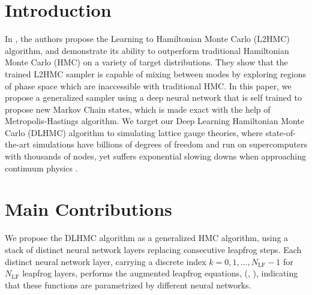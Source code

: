 \documentclass{article} %
\begin{document}
\section{\label{sec:introduction}Introduction}
In \citet{levy2017}, the authors propose the Learning to Hamiltonian Monte Carlo (L2HMC) algorithm, and demonstrate
its ability to outperform traditional Hamiltonian Monte Carlo (HMC) on a variety of %
target
distributions.
%
They show that the trained L2HMC sampler is capable of mixing between modes by exploring regions of phase space which are %
inaccessible with traditional HMC.
%
In this paper, we propose a generalized sampler using a deep neural network that is self trained to propose new Markov Chain states,
which is made exact with the help of Metropolis-Hastings \citep{zbMATH03349185} algorithm.
We target our Deep Learning Hamiltonian Monte Carlo (DLHMC) algorithm to simulating lattice gauge theories,
where state-of-the-art simulations have billions of degrees of freedom and run on supercomputers with thousands of nodes,
yet suffers exponential slowing downs when approaching continuum physics \citep{schaefer2009investigating,cossu2018testing}.

\section{\label{sec:main_contributions}Main Contributions}
We propose the DLHMC algorithm as a generalized HMC algorithm,
      using a stack of distinct neural network layers replacing consecutive leapfrog steps.
      Each distinct neural network layer, carrying a discrete index \(k = 0, 1, \ldots, N_{\mathrm{LF}}-1\) for $N_{\mathrm{LF}}$
      leapfrog layers, performs the
      augmented leapfrog equations, (, ), indicating that
      these functions are parametrized by different neural networks.
      
\end{document}
